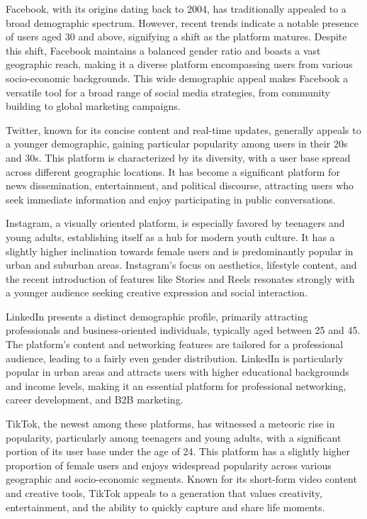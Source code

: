 \documentclass[
]{book}
\begin{document}
Facebook, with its origins dating back to 2004, has traditionally appealed to a broad demographic spectrum. However, recent trends indicate a notable presence of users aged 30 and above, signifying a shift as the platform matures. Despite this shift, Facebook maintains a balanced gender ratio and boasts a vast geographic reach, making it a diverse platform encompassing users from various socio-economic backgrounds. This wide demographic appeal makes Facebook a versatile tool for a broad range of social media strategies, from community building to global marketing campaigns.

Twitter, known for its concise content and real-time updates, generally appeals to a younger demographic, gaining particular popularity among users in their 20s and 30s. This platform is characterized by its diversity, with a user base spread across different geographic locations. It has become a significant platform for news dissemination, entertainment, and political discourse, attracting users who seek immediate information and enjoy participating in public conversations.

Instagram, a visually oriented platform, is especially favored by teenagers and young adults, establishing itself as a hub for modern youth culture. It has a slightly higher inclination towards female users and is predominantly popular in urban and suburban areas. Instagram's focus on aesthetics, lifestyle content, and the recent introduction of features like Stories and Reels resonates strongly with a younger audience seeking creative expression and social interaction.

LinkedIn presents a distinct demographic profile, primarily attracting professionals and business-oriented individuals, typically aged between 25 and 45. The platform's content and networking features are tailored for a professional audience, leading to a fairly even gender distribution. LinkedIn is particularly popular in urban areas and attracts users with higher educational backgrounds and income levels, making it an essential platform for professional networking, career development, and B2B marketing.

TikTok, the newest among these platforms, has witnessed a meteoric rise in popularity, particularly among teenagers and young adults, with a significant portion of its user base under the age of 24. This platform has a slightly higher proportion of female users and enjoys widespread popularity across various geographic and socio-economic segments. Known for its short-form video content and creative tools, TikTok appeals to a generation that values creativity, entertainment, and the ability to quickly capture and share life moments.
\end{document}
